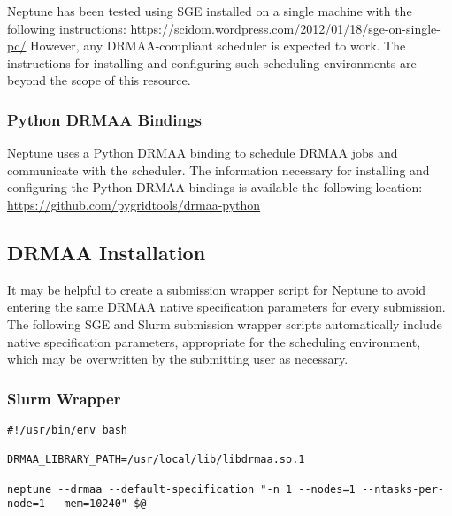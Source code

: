 \documentclass[a4paper,10pt]{article}
\begin{document}
Neptune has been tested using SGE installed on a single machine with the following instructions:
\newline\newline
\url{https://scidom.wordpress.com/2012/01/18/sge-on-single-pc/}
\newline\newline
However, any DRMAA-compliant scheduler is expected to work. The instructions for installing and configuring such scheduling environments are beyond the scope of this resource.

\subsubsection{Python DRMAA Bindings}

Neptune uses a Python DRMAA binding to schedule DRMAA jobs and communicate with the scheduler. The information necessary for installing and configuring the Python DRMAA bindings is available the following location:
\newline\newline
\url{https://github.com/pygridtools/drmaa-python}

\subsection{DRMAA Installation}

It may be helpful to create a submission wrapper script for Neptune to avoid entering the same DRMAA native specification parameters for every submission. The following SGE and Slurm submission wrapper scripts automatically include native specification parameters, appropriate for the scheduling environment, which may be overwritten by the submitting user as necessary.

\subsubsection{Slurm Wrapper}

\begin{minipage}{\linewidth}
\begin{lstlisting}[frame=single, style=bash, title={neptune-slurm}]
#!/usr/bin/env bash

DRMAA_LIBRARY_PATH=/usr/local/lib/libdrmaa.so.1

neptune --drmaa --default-specification "-n 1 --nodes=1 --ntasks-per-node=1 --mem=10240" $@
\end{lstlisting}
\end{minipage}
\end{document}
